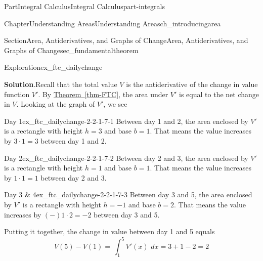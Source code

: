 \documentclass{tufte-book}
\newcommand{\blocktitlefont}{\relax}
\newcommand{\xreffont}{\relax}
\numberwithin{equation}{chapter}
\newcommand{\intdx}[1]{{\,\int#1\,\,dx}}
\newcommand{\dint}[1]{\displaystyle\intdx{#1}}
\begin{document}
\begin{partptx}{Part}{Integral Calculus}{}{Integral Calculus}{}{}{part-integrals}
\begin{chapterptx}{Chapter}{Understanding Areas}{}{Understanding Areas}{}{}{ch_introducingarea}
\begin{sectionptx}{Section}{Area, Antiderivatives, and Graphs of Change}{}{Area, Antiderivatives, and Graphs of Change}{}{}{sec_fundamentaltheorem}
\begin{exploration}{Exploration}{}{ex_ftc_dailychange}
\begin{enumerate}[font=\bfseries,label=(\alph*),ref=\alph*]
\par\smallskip%
\noindent\textbf{\blocktitlefont Solution}.\hypertarget{ex_ftc_dailychange-2-2}{}\quad{}Recall that the total value \(V\) is the antiderivative of the change in value function  \(V'\). By \hyperref[thm-FTC]{Theorem~{\xreffont\ref{thm-FTC}}}, the area under \(V'\) is equal to the net change in \(V\).  Looking at the graph of \(V'\), we see%
\begin{descriptionlist}
\begin{dlimedium}{Day 1}{ex_ftc_dailychange-2-2-1-7-1}%
Between day 1 and 2, the area enclosed by \(V'\) is a rectangle with height \(h=3\) and base \(b=1\). That means the value increases by \(3\cdot 1= 3\)\textdollar{} between day 1 and 2.%
\end{dlimedium}%
\begin{dlimedium}{Day 2}{ex_ftc_dailychange-2-2-1-7-2}%
Between day 2 and 3, the area enclosed by \(V'\) is a rectangle with height \(h=1\) and base \(b=1\). That means the value increases by \(1\cdot 1 = 1\)\textdollar{} between day 2 and 3.%
\end{dlimedium}%
\begin{dlimedium}{Day 3 \& 4}{ex_ftc_dailychange-2-2-1-7-3}%
Between day 3 and 5, the area enclosed by \(V'\) is a rectangle with height \(h=-1\) and base \(b=2\). That means the value increases by \((-) 1\cdot 2 = -2 \)\textdollar{} between day 3 and 5.%
\end{dlimedium}%
\end{descriptionlist}
Putting it together, the change in value between day 1 and 5 equals%
\begin{equation*}
V(5)-V(1) = \dint{_1^5 V'(x) } = 3 + 1 - 2 = 2
\end{equation*}
%
\begin{image}{0.25}{0.5}{0.25}{}%
\end{image}
\end{enumerate}
\end{exploration}
\end{sectionptx}
\end{chapterptx}
\end{partptx}
\end{document}
